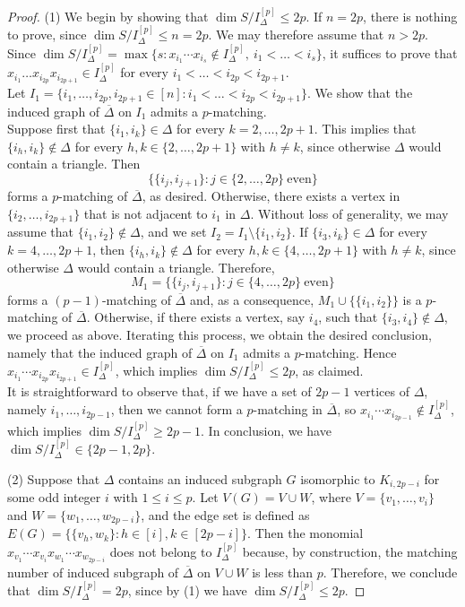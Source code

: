 \documentclass[12pt]{amsart}
\begin{document}
\begin{proof}

(1) We begin by showing that $\dim S/I_{\Delta}^{[p]} \leq 2p$. If $n=2p$, there is nothing to prove, since
$\dim S/I_{\Delta}^{[p]} \leq n = 2p$. We may therefore assume that $n>2p$. Since
$\dim S/I_{\Delta}^{[p]}=\max\{s: x_{i_1}\cdots x_{i_s}\notin I_{\Delta}^{[p]},\ i_1<\dots<i_s\}$,
it suffices to prove that
$x_{i_1}\dots x_{i_{2p}}x_{i_{2p+1}}\in I_{\Delta}^{[p]}$
for every $i_1<\dots<i_{2p}<i_{2p+1}$.\\
Let $I_1=\{i_1,\dots,i_{2p},i_{2p+1}\in [n]: i_1<\dots<i_{2p}<i_{2p+1}\}$.
We show that the induced graph of $\overline{\Delta}$ on $I_1$ admits a $p$-matching.\\
Suppose first that $\{i_{1},i_k\}\in \Delta$ for every $k=2,\dots,2p+1$. This implies that
$\{i_h,i_k\}\notin \Delta$ for every $h,k\in \{2,\dots,2p+1\}$ with $h\neq k$, since otherwise $\Delta$
would contain a triangle. Then
$$\{\{i_j,i_{j+1}\}: j\in\{2,\dots,2p\}\ \text{even}\}$$
forms a $p$-matching of $\overline{\Delta}$, as desired. Otherwise, there exists a vertex in $\{i_2,\dots,i_{2p+1}\}$ that is not adjacent to $i_1$ in $\Delta$.
Without loss of generality, we may assume that $\{i_{1},i_{2}\}\notin \Delta$, and we set
$I_2=I_1\setminus\{i_1,i_2\}$. If $\{i_{3},i_k\}\in \Delta$ for every $k=4,\dots,2p+1$, then
$\{i_h,i_k\}\notin \Delta$ for every $h,k\in \{4,\dots,2p+1\}$ with $h\neq k$, since otherwise $\Delta$
would contain a triangle. Therefore,
$$M_1=\{\{i_j,i_{j+1}\}: j\in\{4,\dots,2p\}\ \text{even}\}$$
forms a $(p-1)$-matching of $\overline{\Delta}$ and, as a consequence,
$M_1\cup \{\{i_1,i_2\}\}$ is a $p$-matching of $\overline{\Delta}$. Otherwise, if there exists a vertex, say $i_4$, such that $\{i_{3},i_{4}\}\notin \Delta$, we proceed as above.
Iterating this process, we obtain the desired conclusion, namely that the induced graph of $\overline{\Delta}$
on $I_1$ admits a $p$-matching. Hence
$x_{i_1}\cdots x_{i_{2p}}x_{i_{2p+1}}\in I_{\Delta}^{[p]}$, which implies
$\dim S/I_{\Delta}^{[p]}\leq 2p$, as claimed.\\
It is straightforward to observe that, if we have a set of $2p-1$ vertices of $\Delta$, namely $i_1,\dots,i_{2p-1}$, then we cannot form a $p$-matching in $\overline{\Delta}$, so $x_{i_1}\cdots x_{i_{2p-1}}\notin I_{\Delta}^{[p]}$, which implies
$\dim S/I_{\Delta}^{[p]}\geq 2p-1$. In conclusion, we have $\dim S/I_{\Delta}^{[p]}\in \{2p-1,2p\}$. 

(2) Suppose that $\Delta$ contains an induced subgraph $G$ isomorphic to $K_{i, 2p-i}$ for some odd integer $i$ with $1 \le i \le p$. Let $V(G) = V \cup W$, where $V = \{v_1, \dots, v_i\}$ and $W = \{w_1, \dots, w_{2p-i}\}$, and the edge set is defined as $E(G) = \{ \{v_h, w_k\} : h \in [i], k \in [2p-i] \}$. Then the monomial $x_{v_1} \cdots x_{v_i} x_{w_1} \cdots x_{w_{2p-i}}$ does not belong to $I_{\Delta}^{[p]}$ because, by construction, the matching number of induced subgraph of $\overline{\Delta}$ on $V \cup W$ is less than $p$. Therefore, we conclude that $\dim S/I_{\Delta}^{[p]} = 2p$, since by (1) we have $\dim S/I_{\Delta}^{[p]} \le 2p$.


\end{proof}
\end{document}
